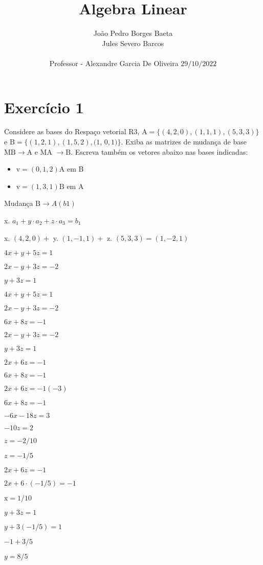 \documentclass[10pt]{article}
\title{Algebra Linear }
\author{João Pedro Borges Baeta\\
Jules Severo Barcos\\\\Professor - Alexandre Garcia De Oliveira
$29 / 10 / 2022$}
\date{}
\begin{document}
\maketitle


\section{Exercício 1}
Considere as bases do Respaço vetorial R3, $\mathrm{A}=\{(4,2,0),(1,1,1),(5,3,3)\}$ e $\mathrm{B}=\{(1,2,1),(1,5,2),(1$, $0,1)\}$. Exiba as matrizes de mudança de base $\mathrm{MB} \rightarrow \mathrm{A}$ e MA $\rightarrow \mathrm{B}$. Escreva também os vetores abaixo nas bases indicadas:

\begin{itemize}
  \item $\mathrm{v}=(0,1,2) \mathrm{A}$ em B

  \item $\mathrm{v}=(1,3,1) \mathrm{B}$ em $\mathrm{A}$

\end{itemize}
Mudança $\mathrm{B} \rightarrow A(b 1)$

x. $a_{1}+y \cdot a_{2}+z \cdot a_{3}=b_{1}$

x. $(4,2,0)+$ y. $(1,-1,1)+$ z. $(5,3,3)=(1,-2,1)$

$4 x+y+5 z=1$

$2 x-y+3 z=-2$

$y+3 z=1$

$4 x+y+5 z=1$

$2 x-y+3 z=-2$

$6 x+8 z=-1$

$2 x-y+3 z=-2$

$y+3 z=1$

$2 x+6 z=-1$

$6 x+8 z=-1$

$2 x+6 z=-1(-3)$

$6 x+8 z=-1$

$-6 x-18 z=3$

$-10 z=2$

$z=-2 / 10$

$z=-1 / 5$

$2 x+6 z=-1$

$2 x+6 \cdot(-1 / 5)=-1$

$\mathrm{x}=1 / 10$

$y+3 z=1$

$y+3(-1 / 5)=1$

$-1+3 / 5$

$y=8 / 5$
\end{document}
